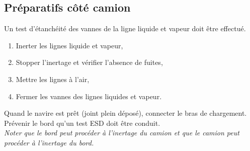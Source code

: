 \documentclass[12pt,a4paper]{article}
\begin{document}
\subsection*{Préparatifs côté camion}
Un test d'étanchéité des vannes de la ligne liquide et vapeur doit être effectué. 
\begin{enumerate}
 \item Inerter les lignes liquide et vapeur,
 \item Stopper l'inertage et vérifier l'absence de fuites,
 \item Mettre les lignes à l'air,
 \item Fermer les vannes des lignes liquides et vapeur.
\end{enumerate}
 Quand le navire est prêt (joint plein déposé), connecter le bras de chargement. \\
 Prévenir le bord qu'un test ESD doit être conduit.\\
 
 \emph{Noter que le bord peut procéder à l'inertage du camion et que le camion peut procéder à l'inertage du bord.}
\end{document}
